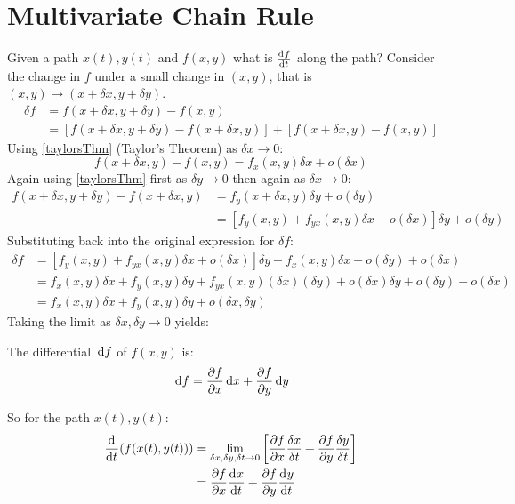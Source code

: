 \documentclass[../main.tex]{subfiles}
\begin{document}
\section{Multivariate Chain Rule}
Given a path $x(t), y(t)$ and $f(x, y)$ what is $\deriv{f}{t}$ along the path?
Consider the change in $f$ under a small change in $(x, y)$, that is $(x, y) \mapsto (x + \delta x, y + \delta y)$.
\begin{align*}
  \delta f &= f(x + \delta x, y + \delta y) - f(x, y) \\
           &= [f(x + \delta x, y + \delta y) - f(x + \delta x, y)] + [f(x + \delta x, y) - f(x, y)]
\end{align*}
Using \cref{taylorsThm} (Taylor's Theorem) as $\delta x \to 0$:
\[
  f(x + \delta x, y) - f(x, y) = f_x(x, y) \delta x + o(\delta x)
\]
Again using \cref{taylorsThm} first as $\delta y \to 0$ then again as $\delta x \to 0$:
\begin{align*}
  f(x + \delta x, y + \delta y) - f(x + \delta x, y) &= f_y(x + \delta x, y)\delta y + o(\delta y) \\
                                                     &= [f_y(x, y) + f_{yx}(x, y)\delta x + o(\delta x)] \delta y + o(\delta y)
\end{align*}
Substituting back into the original expression for $\delta f$:
\begin{align*}
  \delta f &= [f_y(x, y) + f_{yx}(x,y)\delta x + o(\delta x)]\delta y + f_x(x, y)\delta x + o(\delta y) + o(\delta x) \\
           &= f_x(x, y)\delta x + f_y(x, y)\delta y + f_{yx}(x, y)(\delta x)(\delta y) + o(\delta x)\delta y + o(\delta y) + o(\delta x) \\
           &= f_x(x, y)\delta x + f_y(x, y)\delta y + o(\delta x, \delta y)
\end{align*}
Taking the limit as $\delta x, \delta y \to 0$ yields:
\begin{theorem}
  The differential $\,\mathrm{d} f$ of $f(x, y)$ is:
  \[
    \d{f} = \pderiv{f}{x}\d{x} + \pderiv{f}{y}\d{y}
  \]
\end{theorem}
So for the path $x(t), y(t)$:
\begin{align*}
  \deriv{}{t}(f(x(t), y(t))) &= \lim_{\delta x, \delta y, \delta t \to 0} \left[\pderiv{f}{x} \frac{\delta x}{\delta t} + \pderiv{f}{y} \frac{\delta y}{\delta t}\right] \\
  &= \pderiv{f}{x} \deriv{x}{t} + \pderiv{f}{y} \deriv{y}{t}
\end{align*}
\end{document}
